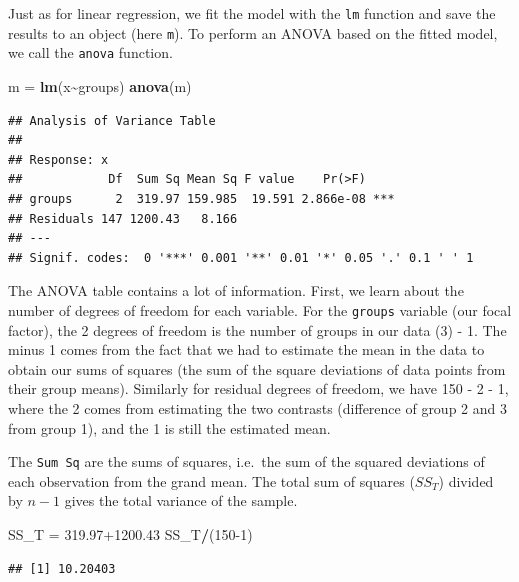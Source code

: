 \documentclass[
]{article}
\newenvironment{Shaded}{\begin{snugshade}}{\end{snugshade}}
\newcommand{\DecValTok}[1]{\textcolor[rgb]{0.00,0.00,0.81}{#1}}
\newcommand{\FloatTok}[1]{\textcolor[rgb]{0.00,0.00,0.81}{#1}}
\newcommand{\FunctionTok}[1]{\textcolor[rgb]{0.13,0.29,0.53}{\textbf{#1}}}
\newcommand{\NormalTok}[1]{#1}
\newcommand{\OtherTok}[1]{\textcolor[rgb]{0.56,0.35,0.01}{#1}}
\newcommand{\SpecialCharTok}[1]{\textcolor[rgb]{0.81,0.36,0.00}{\textbf{#1}}}
\begin{document}
Just as for linear regression, we fit the model with the \texttt{lm}
function and save the results to an object (here \texttt{m}). To perform
an ANOVA based on the fitted model, we call the \texttt{anova} function.

\begin{Shaded}
\begin{Highlighting}[]
\NormalTok{m }\OtherTok{=} \FunctionTok{lm}\NormalTok{(x}\SpecialCharTok{\textasciitilde{}}\NormalTok{groups)}
\FunctionTok{anova}\NormalTok{(m)}
\end{Highlighting}
\end{Shaded}

\begin{verbatim}
## Analysis of Variance Table
## 
## Response: x
##            Df  Sum Sq Mean Sq F value    Pr(>F)    
## groups      2  319.97 159.985  19.591 2.866e-08 ***
## Residuals 147 1200.43   8.166                      
## ---
## Signif. codes:  0 '***' 0.001 '**' 0.01 '*' 0.05 '.' 0.1 ' ' 1
\end{verbatim}

The ANOVA table contains a lot of information. First, we learn about the
number of degrees of freedom for each variable. For the \texttt{groups}
variable (our focal factor), the 2 degrees of freedom is the number of
groups in our data (3) - 1. The minus 1 comes from the fact that we had
to estimate the mean in the data to obtain our sums of squares (the sum
of the square deviations of data points from their group means).
Similarly for residual degrees of freedom, we have 150 - 2 - 1, where
the 2 comes from estimating the two contrasts (difference of group 2 and
3 from group 1), and the 1 is still the estimated mean.

The \texttt{Sum\ Sq} are the sums of squares, i.e.~the sum of the
squared deviations of each observation from the grand mean. The total
sum of squares (\(SS_T\)) divided by \(n-1\) gives the total variance of
the sample.

\begin{Shaded}
\begin{Highlighting}[]
\NormalTok{SS\_T }\OtherTok{=} \FloatTok{319.97+1200.43}
\NormalTok{SS\_T}\SpecialCharTok{/}\NormalTok{(}\DecValTok{150{-}1}\NormalTok{)}
\end{Highlighting}
\end{Shaded}

\begin{verbatim}
## [1] 10.20403
\end{verbatim}
\end{document}
